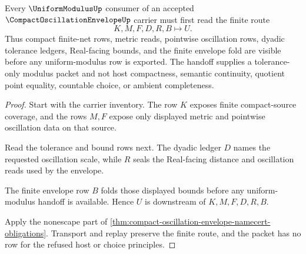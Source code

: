 \begin{theorem}
\label{thm:compact-oscillation-envelope-uniform-modulus-handoff}
Every $\UniformModulusUp$ consumer of an accepted $\CompactOscillationEnvelopeUp$ carrier must first read the finite route
$$
K,M,F,D,R,B \longmapsto U .
$$
Thus compact finite-net rows, metric reads, pointwise oscillation rows, dyadic tolerance ledgers, Real-facing bounds, and the finite envelope fold are visible before any uniform-modulus row is exported. The handoff supplies a tolerance-only modulus packet and not host compactness, semantic continuity, quotient point equality, countable choice, or ambient completeness.
\end{theorem}
\begin{proof}
Start with the carrier inventory. The row $K$ exposes finite compact-source coverage, and the rows $M,F$ expose only displayed metric and pointwise oscillation data on that source.

Read the tolerance and bound rows next. The dyadic ledger $D$ names the requested oscillation scale, while $R$ seals the Real-facing distance and oscillation reads used by the envelope.

The finite envelope row $B$ folds those displayed bounds before any uniform-modulus handoff is available. Hence $U$ is downstream of $K,M,F,D,R,B$.

Apply the nonescape part of \autoref{thm:compact-oscillation-envelope-namecert-obligations}. Transport and replay preserve the finite route, and the packet has no row for the refused host or choice principles.
\end{proof}

